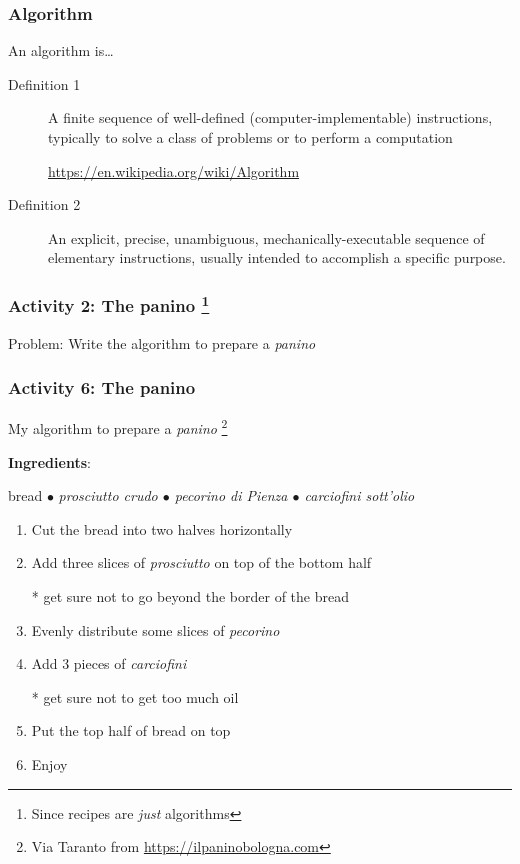 \documentclass[xcolor=x11names,handout]{beamer}
\begin{document}

\begin{frame}
\frametitle{Algorithm}

An algorithm is\ldots 
\bigskip

\begin{description}
 \item[Definition 1]
A finite sequence of \alert{well-defined (computer-implementable) 
instructions}, typically to solve a class of problems or to perform a 
computation

\begin{flushright}
\url{https://en.wikipedia.org/wiki/Algorithm}
\end{flushright}
\bigskip 			\pause 

\item[Definition 2]
An explicit, precise, unambiguous, mechanically-executable sequence of 
elementary instructions, usually intended to accomplish a specific purpose. 

\begin{flushright}
\citet[p. 1]{Erickson:19} 
\end{flushright}
\end{description}

\end{frame}

\begin{frame}
\frametitle{Activity 2: The panino%
\footnote{Since recipes are \textit{just} algorithms}
}

\alert{Problem:} Write the algorithm to prepare a \textit{panino}
\end{frame}

\begin{frame}
\frametitle{Activity 6: The panino}

\alert{My} algorithm to prepare a \textit{panino}%
\footnote{Via Taranto from \url{https://ilpaninobologna.com}}	\pause 

\textbf{Ingredients}: 

bread $\bullet$ \textit{prosciutto crudo $\bullet$ pecorino di Pienza $\bullet$ 
carciofini sott'olio}	\pause 
\begin{enumerate}
 \item Cut the bread into two halves horizontally		\pause 
 \item Add three slices of \textit{prosciutto} on top of the bottom half	
 
	* get sure not to go beyond the border of the bread			\pause 
 \item Evenly distribute some slices of \textit{pecorino}		\pause
 \item Add 3 pieces of \textit{carciofini}
 
		* get sure not to get too much oil\pause
 \item Put the top half of bread on top					\pause
 \item Enjoy
\end{enumerate}
\end{frame}
\end{document}
